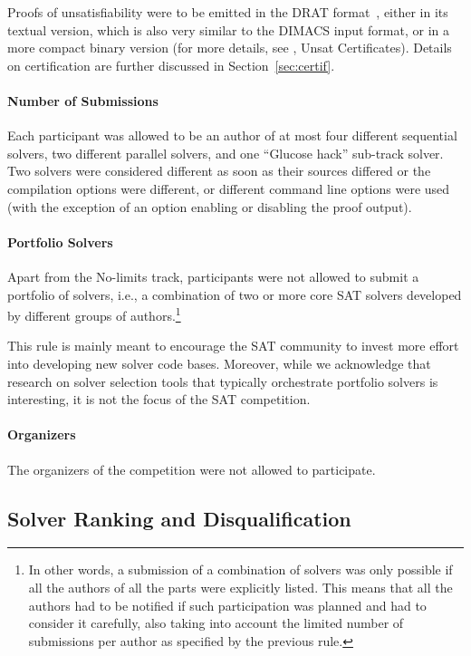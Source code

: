 \documentclass{elsarticle}
\begin{document}
Proofs of unsatisfiability were to be emitted in the DRAT format~\cite{DRATtrim},
either in its textual version, which is also very similar to the DIMACS input format,
or in a more compact binary version (for more details, see \cite{satComp2020www}, Unsat Certificates).
%
Details on certification are further discussed in Section~\ref{sec:certif}.

\paragraph{Number of Submissions}

Each participant was allowed to be an author of at most four different sequential solvers,
two different parallel solvers, and one ``Glucose hack'' sub-track solver.
Two solvers were considered different as soon as their sources differed
or the compilation options were different, or different command line options were used
(with the exception of an option enabling or disabling the proof output).

\paragraph{Portfolio Solvers}

Apart from the No-limits track, participants were not allowed to submit a portfolio of solvers,
i.e., a combination of two or more core SAT solvers developed by different groups of authors.\footnote{
In other words, a submission of a combination of solvers was only possible if all the authors of all the parts
were explicitly listed. This means that all the authors had to be notified if such participation
was planned and had to consider it carefully, also taking into account the limited number of submissions per author
as specified by the previous rule.}

This rule is mainly meant to encourage the SAT community to invest more effort into developing new solver code bases.
Moreover, while we acknowledge that research on solver selection tools that typically orchestrate portfolio solvers 
is interesting, it is not the focus of the SAT competition.


\paragraph{Organizers}
The organizers of the competition were not allowed to participate.

\subsection{Solver Ranking and Disqualification}
\end{document}
